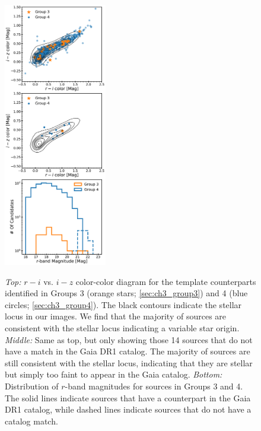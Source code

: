 \begin{figure}[!t]
\begin{center}
\hspace*{-0.1in}
\scalebox{1.}
{\includegraphics[width=0.4\textwidth]{./figs/chapter3/f2.pdf}}
\caption{{\it Top:} $r-i$ vs. $i-z$ color-color diagram for the template counterparts identified in Groups 3 (orange stars; \cref{sec:ch3_group3}) and 4 (blue circles; \cref{sec:ch3_group4}). The black contours indicate the stellar locus in our images. We find that the majority of sources are consistent with the stellar locus indicating a variable star origin.
{\it Middle:} Same as top, but only showing those 14 sources that do not have a match in the Gaia DR1 catalog. The majority of sources are still consistent with the stellar locus, indicating that they are stellar but simply too faint to appear in the Gaia catalog.
{\it Bottom:} Distribution of $r$-band magnitudes for sources in Groups 3 and 4. The solid lines indicate sources that have a counterpart in the Gaia DR1 catalog, while dashed lines indicate sources that do not have a catalog match.}
\label{fig:ch3_color_color}
\end{center}
\end{figure}

